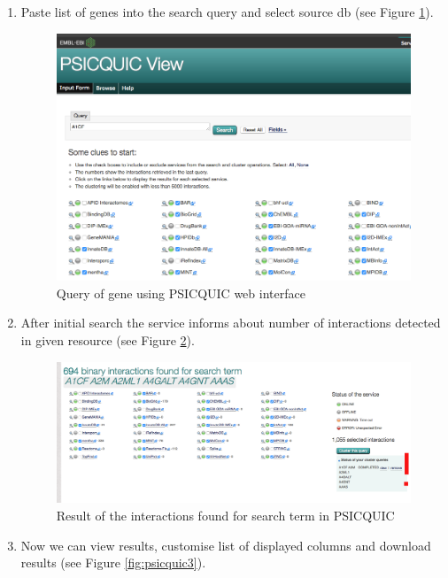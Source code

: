 \documentclass[11pt, oneside]{article}   	%
\begin{document}
\begin{enumerate}
   \item Paste list of genes into the search query and select source db (see Figure \ref{fig:psicquic1}).


   \begin{figure}[!ht]
	\centering
	\includegraphics[width=\textwidth]{psicquic1}
	\caption{Query of gene using PSICQUIC web interface}
	\label{fig:psicquic1}
   \end{figure}

   \item After initial search the service informs about number of interactions detected in given resource (see Figure \ref{fig:psicquic2}).

   \begin{figure}[!ht]
	\centering
	\includegraphics[width=\textwidth]{psicquic2}
	\caption{Result of the interactions found for search term in PSICQUIC}
	\label{fig:psicquic2}
   \end{figure}
   
   \item Now we can view results, customise list of displayed columns and download results (see Figure \ref{fig:psicquic3}).
   


\end{enumerate}
\end{document}
